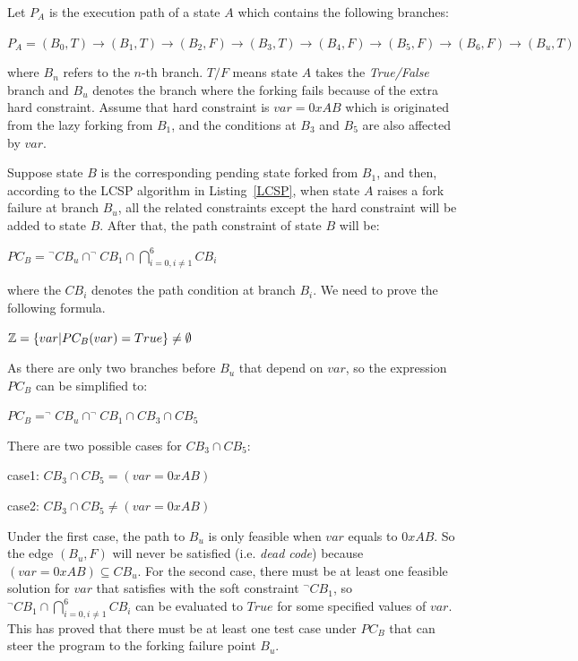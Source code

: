 Let $P_A$ is the execution path of a state $A$ which contains the following branches:


\begin{center}
$P_A = (B_0,T) \rightarrow (B_1,T) \rightarrow (B_2,F) \rightarrow (B_3,T)
\rightarrow (B_4,F) \rightarrow (B_5,F) \rightarrow (B_6,F) \rightarrow (B_u,T)$
\end{center}

\noindent where $B_n$ refers to the $n$-th branch. $T/F$ means state $A$ takes the \emph{True/False} branch and $B_u$ denotes the branch where the forking fails because of the extra hard constraint. Assume that hard constraint is $var=0xAB$ which is originated from the lazy forking from $B_1$, and the conditions at $B_3$ and $B_5$ are also affected by $var$.

Suppose state $B$ is the corresponding pending state forked from $B_1$, and then, according to the LCSP algorithm in Listing~\ref{LCSP}, when state $A$ raises a fork failure at branch $B_u$, all the related constraints except the hard constraint will be added to state $B$. After that, the path constraint of state $B$ will be:

\begin{center}
$PC_B = \displaystyle ^\neg CB_u \cap ^\neg CB_1 \cap \bigcap\limits_{i=0,i \neq 1}^{6} CB_i$
\end{center}
\noindent where the $CB_i$ denotes the path condition at branch $B_i$. We need to prove the following formula.

\begin{center}
$\mathbb{Z} = \{var\arrowvert PC_B(var) = True\} \neq \emptyset$
\end{center}

As there are only two branches before $B_u$ that depend on $var$, so the expression $PC_B$ can be simplified to:
\begin{center}
$PC_B = ^\neg CB_u \cap ^\neg CB_1 \cap CB_3 \cap CB_5$
\end{center}

There are two possible cases for $CB_3 \cap CB_5$:
\begin{center}
case1: $CB_3 \cap CB_5 = (var = 0xAB)$

case2: $CB_3 \cap CB_5 \neq (var = 0xAB)$
\end{center}

Under the first case, the path to $B_u$ is only feasible when $var$ equals to $0xAB$. So the edge $(B_u, F)$ will never be satisfied (i.e. \emph{dead code}) because $(var = 0xAB) \subseteq CB_u$. For the second case, there must be at least one feasible solution for $var$ that satisfies with the soft constraint $^\neg CB_1$, so $^\neg CB_1 \cap \bigcap_{i=0,i \neq 1}^{6} CB_i$ can be evaluated to $True$ for some specified values of $var$. This has proved that there must be at least one test case under $PC_B$ that can steer the program to the forking failure point $B_u$.

